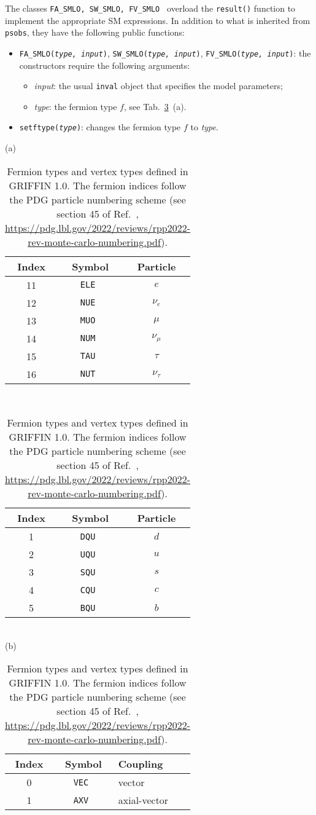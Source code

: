 \documentclass[12pt]{article}
\begin{document}
The classes \texttt{FA\_SMLO, SW\_SMLO, FV\_SMLO } overload the \texttt{result()} function to implement the appropriate SM expressions. In addition to what is inherited from {\tt psobs}, they have the following public functions:
\begin{itemize}
    \item \texttt{FA\_SMLO({\rm\it type, input})}, \texttt{SW\_SMLO({\rm\it type, input})}, \texttt{FV\_SMLO({\rm\it type, input})}: the constructors require the following arguments:
     \begin{itemize}
       \item[] {\it input}: the usual \texttt{inval} object that specifies the model parameters;
       \item[] {\it type}: the fermion type $f$, see Tab.~\ref{tab:ftype}~(a).
     \end{itemize}
    \item \texttt{setftype({\rm\it type})}: changes the fermion type $f$ to {\it type}.
\end{itemize}

\begin{table}[t]
\renewcommand{\arraystretch}{1.1}
\centering
(a)
\begin{tabular}[t]{c|c|c}
\hline
Index & Symbol & Particle \\
\hline
11 & \tt ELE & $e$ \\
12 & \tt NUE & $\nu_e$ \\
13 & \tt MUO & $\mu$ \\
14 & \tt NUM & $\nu_\mu$ \\
15 & \tt TAU & $\tau$ \\
16 & \tt NUT & $\nu_\tau$ \\
\hline
\end{tabular}
\ 
\begin{tabular}[t]{c|c|c}
\hline
Index & Symbol & Particle \\
\hline
1 & \tt DQU & $d$ \\
2 & \tt UQU & $u$ \\
3 & \tt SQU & $s$ \\
4 & \tt CQU & $c$ \\
5 & \tt BQU & $b$ \\
\hline
\end{tabular}
\\[1em]
(b)
\begin{tabular}[t]{c|c|l}
\hline
Index & Symbol & Coupling \\
\hline
0 & \tt VEC & vector \\
1 & \tt AXV & axial-vector \\
\hline
\end{tabular}
\caption{Fermion types and vertex types defined in {\sc GRIFFIN 1.0}. The fermion indices follow the PDG particle numbering scheme (see section 45 of Ref.~\cite{Workman:2022ynf}, \protect\url{https://pdg.lbl.gov/2022/reviews/rpp2022-rev-monte-carlo-numbering.pdf}).}
\label{tab:ftype}
\end{table}
\end{document}
